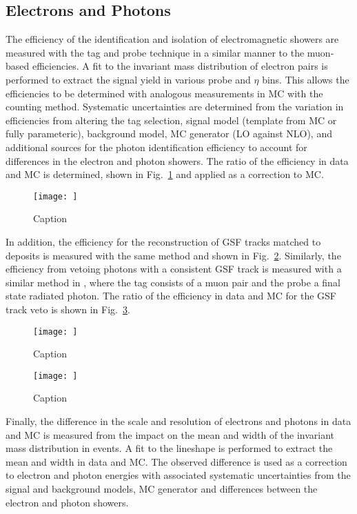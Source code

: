 \subsection{Electrons and Photons}

The efficiency of the identification and isolation of electromagnetic showers
are measured with the tag and probe technique in a similar manner to the
muon-based efficiencies. A fit to the invariant mass distribution of electron
pairs is performed to extract the signal yield in various probe \pt and $\eta$
bins. This allows the efficiencies to be determined with analogous
measurements in MC with the counting method. Systematic uncertainties are
determined from the variation in efficiencies from altering the tag selection,
signal model (template from MC or fully parameteric), background model, MC
generator (LO against NLO), and additional sources for the photon
identification efficiency to account for differences in the electron and
photon showers. The ratio of the efficiency in data and MC is determined,
shown in Fig.~\ref{fig:egamma-id-iso-efficiency} and applied as a correction
to MC.

\begin{figure}[htbp]
    \centering
    \texttt{[image: ]}
    \caption{Caption}
    \label{fig:egamma-id-iso-efficiency}
\end{figure}

In addition, the efficiency for the reconstruction of GSF tracks matched to
\ECAL deposits is measured with the same method and shown in
Fig.~\ref{fig:electron-reco-efficiency}. Similarly, the efficiency from
vetoing photons with a consistent GSF track is measured with a similar method
in \IDYmmg, where the tag consists of a muon pair and the probe a
final state radiated photon. The ratio of the efficiency in data and MC for
the GSF track veto is shown in Fig.~\ref{fig:photon-trackveto-efficiency}.

\begin{figure}[htbp]
    \centering
    \texttt{[image: ]}
    \caption{Caption}
    \label{fig:electron-reco-efficiency}
\end{figure}

\begin{figure}[htbp]
    \centering
    \texttt{[image: ]}
    \caption{Caption}
    \label{fig:photon-trackveto-efficiency}
\end{figure}

Finally, the difference in the scale and resolution of electrons and photons
in data and MC is measured from the impact on the mean and width of the
invariant mass distribution in \IDYee events. A fit to the \PZ lineshape is
performed to extract the mean and width in data and MC. The observed
difference is used as a correction to electron and photon energies with
associated systematic uncertainties from the signal and background models, MC
generator and differences between the electron and photon showers.

